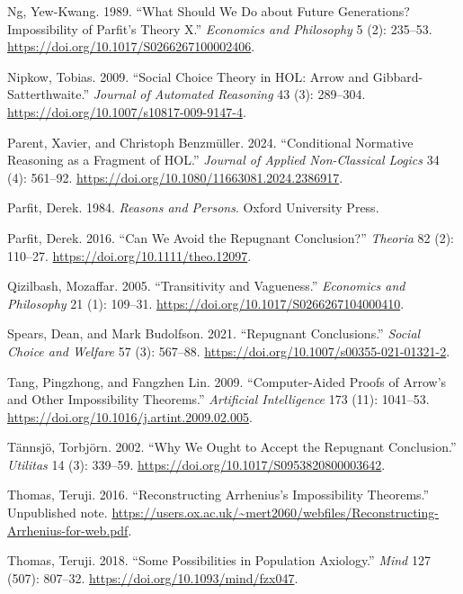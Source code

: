 \documentclass[
  11pt,
  letterpaper,
  DIV=11,
  numbers=noendperiod,
  twoside]{scrartcl}
\newlength{\cslhangindent}
\newenvironment{CSLReferences}[2] %
 {\begin{list}{}{%
  \setlength{\itemindent}{0pt}
  \setlength{\leftmargin}{0pt}
  \setlength{\parsep}{0pt}
  \ifodd #1
   \setlength{\leftmargin}{\cslhangindent}
   \setlength{\itemindent}{-1\cslhangindent}
  \fi
  \setlength{\itemsep}{#2\baselineskip}}}
 {\end{list}}
\begin{document}
\begin{CSLReferences}{1}{1}
Ng, Yew-Kwang. 1989. {``What Should We Do about Future Generations?
{I}mpossibility of {P}arfit's {T}heory {X}.''} \emph{Economics and
Philosophy} 5 (2): 235--53.
\url{https://doi.org/10.1017/S0266267100002406}.

Nipkow, Tobias. 2009. {``Social Choice Theory in {HOL}: {A}rrow and
{G}ibbard-{S}atterthwaite.''} \emph{Journal of Automated Reasoning} 43
(3): 289--304. \url{https://doi.org/10.1007/s10817-009-9147-4}.

Parent, Xavier, and Christoph Benzmüller. 2024. {``Conditional Normative
Reasoning as a Fragment of {HOL}.''} \emph{Journal of Applied
Non-Classical Logics} 34 (4): 561--92.
\url{https://doi.org/10.1080/11663081.2024.2386917}.

Parfit, Derek. 1984. \emph{Reasons and Persons}. Oxford University
Press.

Parfit, Derek. 2016. {``Can We Avoid the Repugnant Conclusion?''}
\emph{Theoria} 82 (2): 110--27.
\url{https://doi.org/10.1111/theo.12097}.

Qizilbash, Mozaffar. 2005. {``Transitivity and Vagueness.''}
\emph{Economics and Philosophy} 21 (1): 109--31.
\url{https://doi.org/10.1017/S0266267104000410}.

Spears, Dean, and Mark Budolfson. 2021. {``Repugnant Conclusions.''}
\emph{Social Choice and Welfare} 57 (3): 567--88.
\url{https://doi.org/10.1007/s00355-021-01321-2}.

Tang, Pingzhong, and Fangzhen Lin. 2009. {``Computer-Aided Proofs of
{A}rrow's and Other Impossibility Theorems.''} \emph{Artificial
Intelligence} 173 (11): 1041--53.
\url{https://doi.org/10.1016/j.artint.2009.02.005}.

Tännsjö, Torbjörn. 2002. {``Why We Ought to Accept the Repugnant
Conclusion.''} \emph{Utilitas} 14 (3): 339--59.
\url{https://doi.org/10.1017/S0953820800003642}.

Thomas, Teruji. 2016. {``Reconstructing {A}rrhenius's Impossibility
Theorems.''} Unpublished note.
\url{https://users.ox.ac.uk/~mert2060/webfiles/Reconstructing-Arrhenius-for-web.pdf}.

Thomas, Teruji. 2018. {``Some Possibilities in Population Axiology.''}
\emph{Mind} 127 (507): 807--32.
\url{https://doi.org/10.1093/mind/fzx047}.


\end{CSLReferences}
\end{document}
